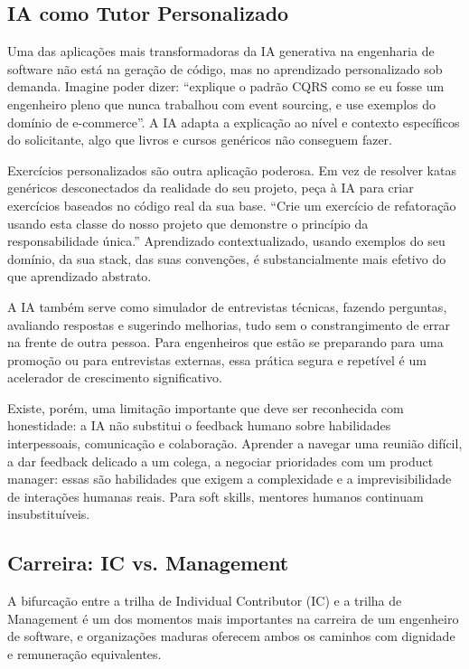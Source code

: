 \subsection{IA como Tutor Personalizado}

Uma das aplicações mais transformadoras da IA generativa na engenharia de
software não está na geração de código, mas no aprendizado personalizado sob
demanda. Imagine poder dizer: ``explique o padrão CQRS como se eu fosse um
engenheiro pleno que nunca trabalhou com event sourcing, e use exemplos do
domínio de e-commerce''. A IA adapta a explicação ao nível e contexto
específicos do solicitante, algo que livros e cursos genéricos não conseguem
fazer.

Exercícios personalizados são outra aplicação poderosa. Em vez de resolver
katas genéricos desconectados da realidade do seu projeto, peça à IA para
criar exercícios baseados no código real da sua base. ``Crie um exercício de
refatoração usando esta classe do nosso projeto que demonstre o princípio da
responsabilidade única.'' Aprendizado contextualizado, usando exemplos do
seu domínio, da sua stack, das suas convenções, é substancialmente mais
efetivo do que aprendizado abstrato.

A IA também serve como simulador de entrevistas técnicas, fazendo perguntas,
avaliando respostas e sugerindo melhorias, tudo sem o constrangimento de
errar na frente de outra pessoa. Para engenheiros que estão se preparando para
uma promoção ou para entrevistas externas, essa prática segura e repetível é
um acelerador de crescimento significativo.

Existe, porém, uma limitação importante que deve ser reconhecida com
honestidade: a IA não substitui o feedback humano sobre habilidades
interpessoais, comunicação e colaboração. Aprender a navegar uma reunião
difícil, a dar feedback delicado a um colega, a negociar prioridades com um
product manager: essas são habilidades que exigem a complexidade e a
imprevisibilidade de interações humanas reais. Para soft skills, mentores
humanos continuam insubstituíveis.

\subsection{Carreira: IC vs. Management}

A bifurcação entre a trilha de Individual Contributor (IC) e a trilha de
Management é um dos momentos mais importantes na carreira de um engenheiro de
software, e organizações maduras oferecem ambos os caminhos com dignidade e
remuneração equivalentes.

